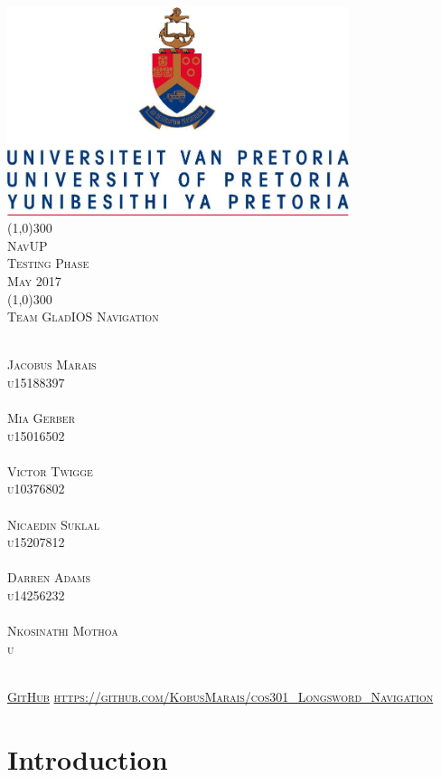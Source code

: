 \documentclass[runningheads,a4paper]{article}
\begin{document}
\begin{titlepage}
\begin{center}
\includegraphics[width=10cm]{UP.jpg}  \\
[1cm]
\line(1,0){300} \\
[0.3cm]
\textsc{\Large
NavUP \\
Testing Phase \\
\hfill {} May 2017
}\\
[0.1cm]
\line(1,0){300} \\
[0.7cm]
\textsc{\Large
Team GladIOS Navigation
} \\
\end{center}
\begin{center}
\begin{multicols}{2}
\textsc{\large\\
Jacobus Marais\\ 
u15188397\\ 
}
\textsc{\large\\
Mia Gerber\\
u15016502\\ 
}
\textsc{\large\\
Victor Twigge\\
u10376802\\ 
}
\columnbreak
\textsc{\large\\
Nicaedin Suklal\\
u15207812\\
}
\textsc{\large\\
Darren Adams\\
u14256232\\
}
\textsc{\large\\
Nkosinathi Mothoa\\
u\\
}
\end{multicols}
\textsc{	\\ \href{https://github.com/KobusMarais/cos301_Longsword_Navigation}{GitHub}
\url{https://github.com/KobusMarais/cos301_Longsword_Navigation}}
\end{center}
\end{titlepage}




\begingroup



\tableofcontents


\endgroup

\newpage

\section{Introduction}
\end{document}
